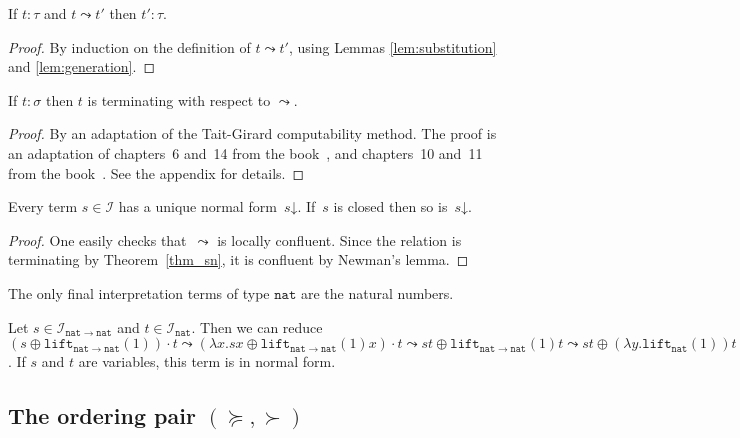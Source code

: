\documentclass[a4paper,UKenglish,cleveref,autoref,numberwithinsect]{lipics-v2019}
\theoremstyle{definition}
\newcommand{\Iterms}{\mathcal{I}}
\newcommand{\arrtype}{\rightarrow}
\newcommand{\abs}[2]{\lambda #1.#2}
\newcommand{\arrW}{\leadsto}
\newcommand{\nat}{\mathtt{nat}}
\newcommand{\lift}{\mathtt{lift}}
\newcommand{\da}{\mathord{\downarrow}}
\begin{document}
\begin{lemma}
  If $t : \tau$ and $t \arrW t'$ then $t' : \tau$.
\end{lemma}

\begin{proof}
  By induction on the definition of $t \arrW t'$, using
  Lemmas \ref{lem:substitution} and \ref{lem:generation}.
\end{proof}

\begin{theorem}\label{thm_sn}
  If $t : \sigma$ then $t$ is terminating with respect to $\arrW$.
\end{theorem}

\begin{proof}
  By an adaptation of the Tait-Girard computability method. The proof
  is an adaptation of chapters~6 and~14 from the
  book~\cite{Girard1989}, and chapters~10 and~11 from the
  book~\cite{SorensenUrzyczyn2006}. See the appendix for details.
\end{proof}

\begin{lemma}\label{lem_unique_final}
  Every term $s \in \Iterms$ has a unique normal form~$s\da$. If~$s$
  is closed then so is~$s\da$.
\end{lemma}

\begin{proof}
  One easily
  checks that~$\arrW$ is locally confluent. Since the
  relation is
  terminating by Theorem~\ref{thm_sn}, it is confluent by Newman's
  lemma.
\end{proof}

\begin{lemma}\label{lem_final_nat}
  The only final interpretation terms of type $\nat$ are the natural
  numbers.
\end{lemma}

\begin{example}\label{ex:arrWreduce}
Let $s \in \Iterms_{\nat \arrtype \nat}$ and $t \in
\Iterms_\nat$. Then we can reduce
$(s \oplus \lift_{\nat \arrtype \nat}(1)) \cdot t \arrW
(\abs{x}{s x \oplus \lift_{\nat \arrtype \nat}(1)x}) \cdot t \arrW
s t \oplus \lift_{\nat \arrtype \nat}(1)t \arrW
s t \oplus (\abs{y}{\lift_{\nat}(1)})t \arrW
s t \oplus \lift_\nat(1) \arrW
s t \oplus 1$. If $s$ and $t$ are variables, this term is in normal
form.
\end{example}

\subsection{The ordering pair $(\succeq,\succ)$}\label{subsec:succ}
\end{document}
